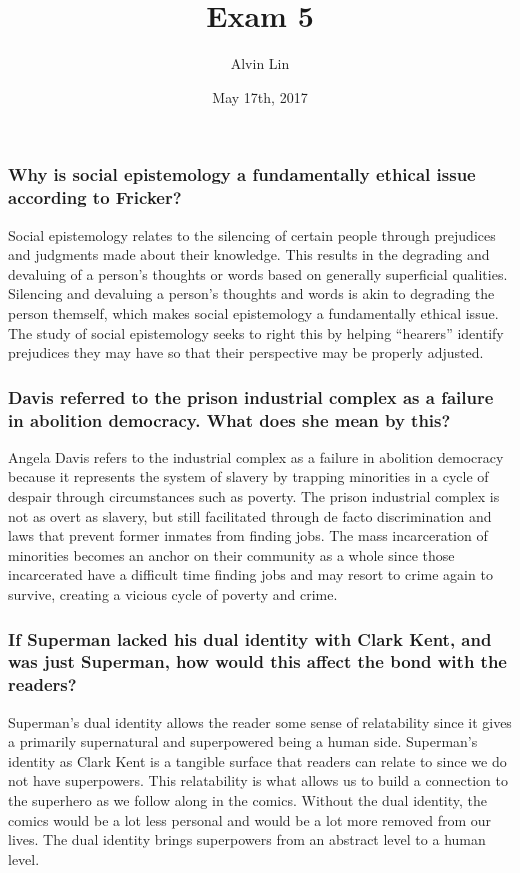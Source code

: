 \documentclass[letterpaper, 12pt]{article}
\title{Exam 5}
\author{Alvin Lin}
\date{May 17th, 2017}
\begin{document}
\maketitle

\subsubsection*{Why is social epistemology a fundamentally ethical issue
according to Fricker?}
Social epistemology relates to the silencing of certain people through
prejudices and judgments made about their knowledge. This results in the
degrading and devaluing of a person's thoughts or words based on generally
superficial qualities. Silencing and devaluing a person's thoughts and words
is akin to degrading the person themself, which makes social epistemology
a fundamentally ethical issue. The study of social epistemology seeks to right
this by helping ``hearers'' identify prejudices they may have so that their
perspective may be properly adjusted.

\subsubsection*{Davis referred to the prison industrial complex as a failure
in abolition democracy. What does she mean by this?}
Angela Davis refers to the industrial complex as a failure in abolition
democracy because it represents the system of slavery by trapping minorities
in a cycle of despair through circumstances such as poverty. The prison
industrial complex is not as overt as slavery, but still facilitated through
de facto discrimination and laws that prevent former inmates from finding jobs.
The mass incarceration of minorities becomes an anchor on their community as a
whole since those incarcerated have a difficult time finding jobs and may
resort to crime again to survive, creating a vicious cycle of poverty and crime.

\subsubsection*{If Superman lacked his dual identity with Clark Kent, and was
just Superman, how would this affect the bond with the readers?}
Superman's dual identity allows the reader some sense of relatability since
it gives a primarily supernatural and superpowered being a human side.
Superman's identity as Clark Kent is a tangible surface that readers can
relate to since we do not have superpowers. This relatability is what allows
us to build a connection to the superhero as we follow along in the comics.
Without the dual identity, the comics would be a lot less personal and would
be a lot more removed from our lives. The dual identity brings superpowers
from an abstract level to a human level.
\end{document}
